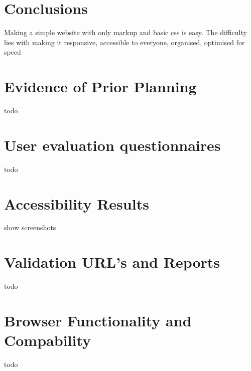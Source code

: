 \documentclass[letterpaper,12pt]{article}
\begin{document}
\section{Conclusions}
\label{sec:conclusions}

Making a simple website with only markup and basic css is easy. The difficulty lies with making it responsive, accessible to everyone, organised, optimised for speed


\begin{appendices}

\clearpage
\section{Evidence of Prior Planning}
todo

\clearpage
\section{User evaluation questionnaires}
todo

\clearpage
\section{Accessibility Results}

show screenshots

\clearpage
\section{Validation URL's and Reports}
todo

\clearpage
\section{Browser Functionality and Compability}
todo

\newpage



\end{appendices}
\end{document}

